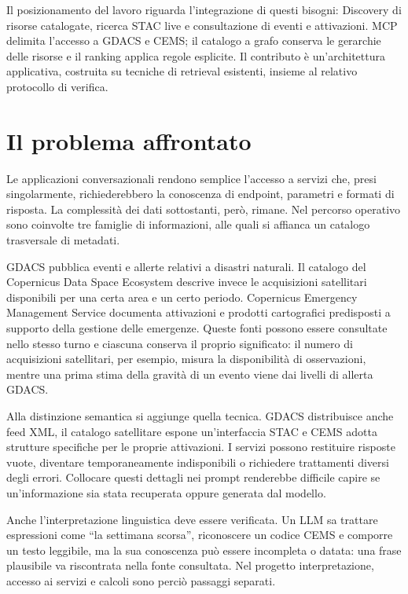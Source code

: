 Il posizionamento del lavoro riguarda l'integrazione di questi bisogni:
Discovery di risorse catalogate, ricerca STAC live e consultazione di eventi
e attivazioni. MCP \cite{mcpSpec} delimita l'accesso a GDACS e CEMS;
il catalogo a grafo conserva le gerarchie delle risorse e il ranking applica
regole esplicite. Il contributo è un'architettura applicativa, costruita su
tecniche di retrieval esistenti, insieme al relativo protocollo di verifica.

\section{Il problema affrontato}

Le applicazioni conversazionali rendono semplice l'accesso a servizi che, presi
singolarmente, richiederebbero la conoscenza di endpoint, parametri e formati di
risposta. La complessità dei dati sottostanti, però, rimane. Nel percorso
operativo sono coinvolte tre famiglie di informazioni, alle quali si affianca
un catalogo trasversale di metadati.

GDACS pubblica eventi e allerte relativi a disastri naturali. Il catalogo del
Copernicus Data Space Ecosystem descrive invece le acquisizioni satellitari
disponibili per una certa area e un certo periodo. Copernicus Emergency
Management Service documenta attivazioni e prodotti cartografici predisposti a
supporto della gestione delle emergenze. Queste fonti possono essere consultate
nello stesso turno e ciascuna conserva il proprio significato: il numero di
acquisizioni satellitari, per esempio, misura la disponibilità di osservazioni,
mentre una prima stima della gravità di un evento viene dai livelli di
allerta GDACS.

Alla distinzione semantica si aggiunge quella tecnica. GDACS distribuisce anche
feed XML, il catalogo satellitare espone un'interfaccia STAC e CEMS adotta
strutture specifiche per le proprie attivazioni. I servizi possono restituire
risposte vuote, diventare temporaneamente indisponibili o richiedere trattamenti
diversi degli errori. Collocare questi dettagli nei prompt renderebbe difficile
capire se un'informazione sia stata recuperata oppure generata dal modello.

Anche l'interpretazione linguistica deve essere verificata. Un LLM sa trattare
espressioni come ``la settimana scorsa'', riconoscere un codice CEMS e comporre
un testo leggibile, ma la sua conoscenza può essere incompleta o datata: una
frase plausibile va riscontrata nella fonte consultata. Nel progetto
interpretazione, accesso ai servizi e calcoli sono perciò passaggi separati.

